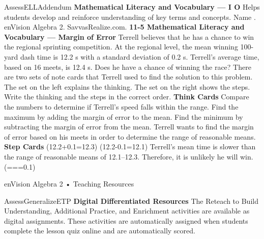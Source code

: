 \documentclass{article}
\newenvironment{te-addendum}[2]{}{}     %
\newcommand{\answer}[1]{}               %
\newcommand{\placeholder}[2]{}          %
\begin{document}
\begin{te-addendum}{Assess}{ELLAddendum}
\textbf{Mathematical Literacy and Vocabulary — I O}
Helps students develop and reinforce understanding of key terms and concepts.
Name \underline{\hspace{2cm}}. enVision Algebra 2. SavvasRealize.com.
\textbf{11-5 Mathematical Literacy and Vocabulary — Margin of Error}
Terrell believes that he has a chance to win the regional sprinting competition. At the regional level, the mean winning 100-yard dash time is 12.2 s with a standard deviation of 0.2 s. Terrell's average time, based on 16 meets, is 12.4 s. Does he have a chance of winning the race?
There are two sets of note cards that Terrell used to find the solution to this problem. The set on the left explains the thinking. The set on the right shows the steps. Write the thinking and the steps in the correct order.
\textbf{Think Cards}
Compare the numbers to determine if Terrell's speed falls within the range.
Find the maximum by adding the margin of error to the mean.
Find the minimum by subtracting the margin of error from the mean.
Terrell wants to find the margin of error based on his meets in order to determine the range of reasonable means.
\textbf{Step Cards}
(12.2+0.1=12.3)
(12.2-0.1=12.1)
Terrell's mean time is slower than the range of reasonable means of 12.1–12.3. Therefore, it is unlikely he will win.
(===0.1)
\answer{Think Cards, in order: Terrell wants to find the margin of error based on his meets in order to determine the range of reasonable means. Find the maximum by adding the margin of error to the mean. Find the minimum by subtracting the margin of error from the mean. Compare the numbers to determine if Terrell's speed falls within the range.}
\answer{Step Cards, in order: (\frac{2\sigma}{\sqrt{n}}=\frac{2(0.2)}{\sqrt{16}}=\frac{0.4}{4}=0.1); (12.2+0.1=12.3); (12.2-0.1=12.1); Terrell's mean time is slower than the range of reasonable means of 12.1–12.3. Therefore, it is unlikely he will win.}
enVision Algebra 2 • Teaching Resources
\end{te-addendum}
\begin{te-addendum}{Assess}{GeneralizeETP}
\textbf{Digital Differentiated Resources}
The Reteach to Build Understanding, Additional Practice, and Enrichment activities are available as digital assignments. These activities are automatically assigned when students complete the lesson quiz online and are automatically scored.
\placeholder{illustration}{Black tablet showing a digital exercise: Solve the system of equations by graphing, y=3x+4 and y=-2x+4. Use the graphing tool to graph the system. Blank coordinate grid from -10 to 10 on both axes, labeled every 2; menu Help Me Solve This, View an Example, Video, Textbook, Glossary, Math Tools, Print. Buttons Clear All, Check Answer, Review progress, Back, Next.}
\end{te-addendum}
\end{document}
